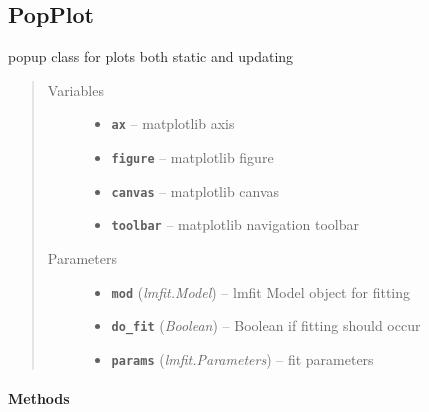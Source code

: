 \documentclass[letterpaper,10pt,english]{sphinxmanual}
\begin{document}
\subsection{PopPlot}
\label{PopPlot::doc}\label{PopPlot:popplot}

\begin{fulllineitems}
\label{PopPlot:Visualplotterwidget.PopPlot}
popup class for plots both static and updating
\begin{quote}\begin{description}
\item[{Variables}] \leavevmode\begin{itemize}
\item {} 
\textbf{\texttt{ax}} -- matplotlib axis

\item {} 
\textbf{\texttt{figure}} -- matplotlib figure

\item {} 
\textbf{\texttt{canvas}} -- matplotlib canvas

\item {} 
\textbf{\texttt{toolbar}} -- matplotlib navigation toolbar

\end{itemize}

\item[{Parameters}] \leavevmode\begin{itemize}
\item {} 
\textbf{\texttt{mod}} (\emph{lmfit.Model}) -- lmfit Model object for fitting

\item {} 
\textbf{\texttt{do\_fit}} (\emph{Boolean}) -- Boolean if fitting should occur

\item {} 
\textbf{\texttt{params}} (\emph{lmfit.Parameters}) -- fit parameters

\end{itemize}

\end{description}\end{quote}
\paragraph{Methods}


\end{fulllineitems}
\end{document}
